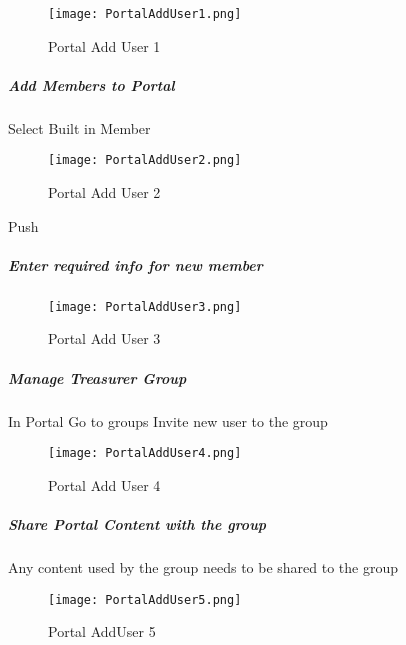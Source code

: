  \begin{figure}[h!]
 \centering
     \texttt{[image: PortalAddUser1.png]}
 \caption{Portal Add User 1}
 \end{figure}
 \clearpage

 \subparagraph{Add Members to Portal}
 
 \vspace{.4in}

 {\Large Select Built in Member {\rtArrow}}
 \vspace{.4in}

 \begin{figure}[h!]
 \centering
     \texttt{[image: PortalAddUser2.png]}
 \caption{Portal Add User 2}
 \end{figure}

{\bigbtn Push }

 \clearpage
 \subparagraph{Enter required info for new member}
 \vspace{.5in}

 \begin{figure}[h!]
 \centering
     \texttt{[image: PortalAddUser3.png]}
 \caption{Portal Add User 3}
 \end{figure}
 \clearpage
 \subparagraph{Manage Treasurer Group}
 \vspace{.5in}

 In Portal {\rtArrow} Go to groups {\rtArrow} Invite new user to the group
 \vspace{.5in}

 \begin{figure}[h!]
 \centering
     \texttt{[image: PortalAddUser4.png]}
 \caption{Portal Add User 4}
 \end{figure}
 \clearpage
 \subparagraph{Share Portal Content with the group}
 \vspace{.5in}

 \noindent Any content used by the group needs to be shared to the group
 \vspace{.5in}

 \begin{figure}[h!]
 \centering
     \texttt{[image: PortalAddUser5.png]}
 \caption{Portal AddUser 5}
 \end{figure}
 \clearpage


